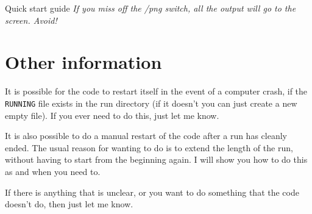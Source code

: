 \begin{chapter}{\label{cha:quickstart} Quick start guide}
  \emph{If you miss off the /png switch, all the output will go to the screen.
  Avoid!}

  \section{Other information}
  It is possible for the code to restart itself in the event of a computer
  crash, if the \verb"RUNNING" file exists in the run directory (if it doesn't
  you can just create a new empty file).  If you ever need to do this, just let
  me know.

  It is also possible to do a manual restart of the code after a run has
  cleanly ended.  The usual reason for wanting to do is to extend the length of
  the run, without having to start from the beginning again.  I will show you
  how to do this as and when you need to.

  If there is anything that is unclear, or you want to do something that the
  code doesn't do, then just let me know.
\end{chapter}

